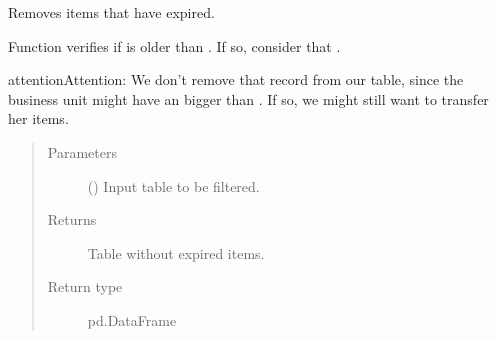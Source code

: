 \documentclass[letterpaper,10pt,english]{sphinxmanual}
\begin{document}

\begin{fulllineitems}
\label{\detokenize{source/optimization.datatools:optimization.datatools.dataprep.remove_expired_items}}
Removes items that have expired.

Function verifies if  is older than .
If so, consider that .

\begin{sphinxadmonition}{attention}{Attention:}
We don’t remove that record from our table, since the business unit
might have an  bigger than .
If so, we might still want to transfer her items.
\end{sphinxadmonition}
\begin{quote}\begin{description}
\item[{Parameters}] \leavevmode
{} () \textendash{} Input table to be filtered.

\item[{Returns}] \leavevmode
Table without expired items.

\item[{Return type}] \leavevmode
pd.DataFrame

\end{description}\end{quote}

\end{fulllineitems}

\end{document}
